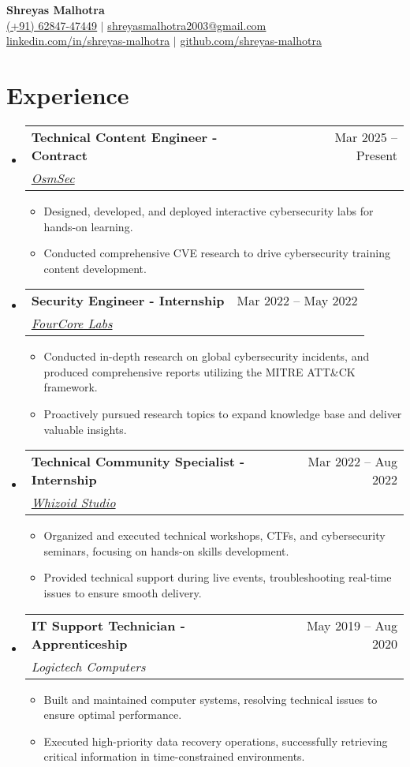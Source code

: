 \documentclass[letterpaper,12pt]{article}
\newcommand{\resumeItem}[1]{
  \item[--]\small{#1} %
}
\newcommand{\resumeSubheading}[4]{
  \item \vspace{1pt}
    \begin{tabularx}{\textwidth}{Xr}
      \textbf{#1} & #2 \\
      \textit{\small#3} & \textit{\small #4} \\
    \end{tabularx} \vspace{1pt}
}
\newcommand{\resumeItemListStart}{\begin{itemize}[topsep=1pt, itemsep=1pt, leftmargin=0.2in]}
\newcommand{\resumeItemListEnd}{\end{itemize} \vspace{1pt}}
\newcommand{\resumeSubHeadingListStart}{\begin{itemize}[leftmargin=0.15in, label={}, topsep=2pt]}
\newcommand{\resumeSubHeadingListEnd}{\end{itemize}}
\begin{document}

\begin{center}
    \textbf{\Huge Shreyas Malhotra} \\ \vspace{4pt}
    \small \href{tel:+916284747449}{\underline{(+91) 62847-47449}} $|$ \small \href{mailto:shreyasmalhotra2003@gmail.com}{\underline{shreyasmalhotra2003@gmail.com}} \\
    \small \href{https://linkedin.com/in/shreyas-malhotra}{\underline{linkedin.com/in/shreyas-malhotra}} $|$
    \small \href{https://github.com/shreyas-malhotra}{\underline{github.com/shreyas-malhotra}}
\end{center}


\section{Experience}
  \resumeSubHeadingListStart
    \resumeSubheading
      {Technical Content Engineer - Contract}{Mar 2025 -- Present}
      {\href{https://osmsec.xyz}{OsmSec}}{}
      \resumeItemListStart
        \resumeItem{Designed, developed, and deployed interactive cybersecurity labs for hands-on learning.}
        \resumeItem{Conducted comprehensive CVE research to drive cybersecurity training content development.}
      \resumeItemListEnd
    
    \resumeSubheading
      {Security Engineer - Internship}{Mar 2022 -- May 2022}
      {\href{https://fourcore.io}{FourCore Labs}}{}
      \resumeItemListStart
        \resumeItem{Conducted in-depth research on global cybersecurity incidents, and produced comprehensive reports utilizing the MITRE ATT\&CK framework.}
        \resumeItem{Proactively pursued research topics to expand knowledge base and deliver valuable insights.}
      \resumeItemListEnd

    \resumeSubheading
      {Technical Community Specialist - Internship}{Mar 2022 -- Aug 2022}
      {\href{https://whizoid.com}{Whizoid Studio}}{}
      \resumeItemListStart
        \resumeItem{Organized and executed technical workshops, CTFs, and cybersecurity seminars, focusing on hands-on skills development.}
        \resumeItem{Provided technical support during live events, troubleshooting real-time issues to ensure smooth delivery.}
      \resumeItemListEnd

    \resumeSubheading
      {IT Support Technician - Apprenticeship}{May 2019 -- Aug 2020}
      {Logictech Computers}{}
      \resumeItemListStart
        \resumeItem{Built and maintained computer systems, resolving technical issues to ensure optimal performance.}
        \resumeItem{Executed high-priority data recovery operations, successfully retrieving critical information in time-constrained environments.}
      \resumeItemListEnd
  \resumeSubHeadingListEnd
\end{document}
